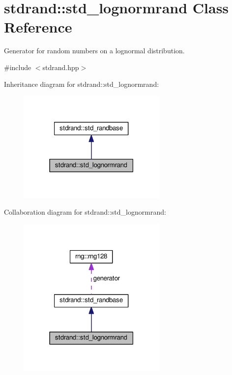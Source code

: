 \hypertarget{classstdrand_1_1std__lognormrand}{}\section{stdrand\+:\+:std\+\_\+lognormrand Class Reference}
\label{classstdrand_1_1std__lognormrand}


Generator for random numbers on a lognormal distribution.  




{\ttfamily \#include $<$stdrand.\+hpp$>$}



Inheritance diagram for stdrand\+:\+:std\+\_\+lognormrand\+:\nopagebreak
\begin{figure}[H]
\begin{center}
\leavevmode
\includegraphics[width=207pt]{d2/deb/classstdrand_1_1std__lognormrand__inherit__graph}
\end{center}
\end{figure}


Collaboration diagram for stdrand\+:\+:std\+\_\+lognormrand\+:
\nopagebreak
\begin{figure}[H]
\begin{center}
\leavevmode
\includegraphics[width=207pt]{d1/d02/classstdrand_1_1std__lognormrand__coll__graph}
\end{center}
\end{figure}
